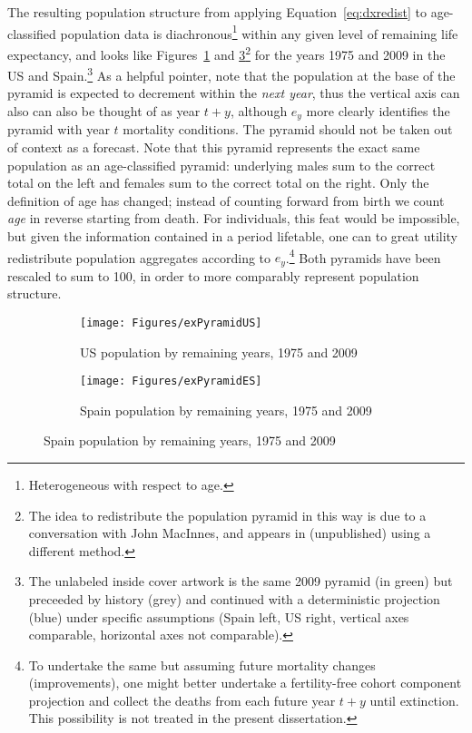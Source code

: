  \FloatBarrier
\label{sec:expopstruct1}
The resulting
population structure from applying Equation~\eqref{eq:dxredist} to
age-classified population data is diachronous\footnote{Heterogeneous with respect to age.} 
within any given level of remaining life expectancy, and 
looks like Figures~\ref{fig:exPyrUS} and \ref{fig:exPyrES}\footnote{The idea to
redistribute the population pyramid in this way is due to a conversation with 
John MacInnes, and appears in \citep{MacInnes2013pop} (unpublished) using a
different method.} for the years 1975 and 2009 in the US and
Spain.\footnote{The unlabeled inside cover artwork is the same 2009 pyramid (in
green) but preceeded by history (grey) and continued with a deterministic
projection (blue) under specific assumptions (Spain left, US right, vertical
axes comparable, horizontal axes not comparable).} As a helpful pointer, note that the
population at the base of the pyramid is expected to decrement within the \textit{next year}, thus the vertical axis can also can also be thought of as year $t+y$, although $e_y$ more clearly identifies the pyramid with year $t$ mortality conditions. The pyramid should not be taken out of context as a forecast. Note that this pyramid represents the exact same
population as an age-classified pyramid: underlying males sum to the correct total on 
the left and females sum to the correct total on the right. Only the definition of age has
changed; instead of counting forward from birth we count \textit{age} in reverse
starting from death. For individuals, this feat would be impossible, but given
 the information contained in a period lifetable, one can to great utility 
 redistribute population aggregates according to $e_y$.\footnote{To undertake
 the same but assuming future mortality changes (improvements), one might
 better undertake a fertility-free cohort component projection and collect the
 deaths from each future year $t+y$ until extinction. This possibility is not
 treated in the present dissertation.} Both pyramids have been rescaled
 to sum to 100, in order to more comparably represent population structure.

\begin{figure}
        \centering
        \begin{subfigure}
                \centering
                \caption{US population by remaining years, 1975 and 2009}
                \texttt{[image: Figures/exPyramidUS]}
                \label{fig:exPyrUS}
        \end{subfigure}
        \begin{subfigure}
                \centering
                \caption{Spain population by remaining years, 1975 and 2009}
                \texttt{[image: Figures/exPyramidES]} 
                \label{fig:exPyrES}
        \end{subfigure}
\end{figure}


